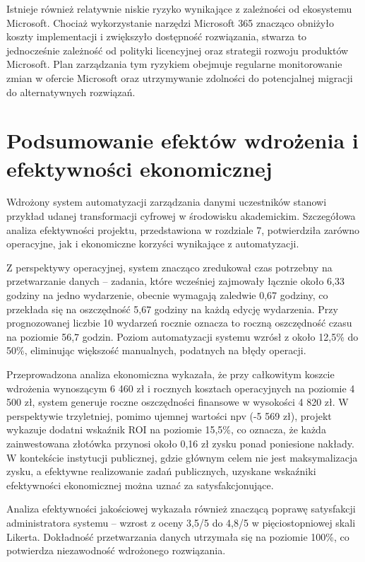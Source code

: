 Istnieje również relatywnie niskie ryzyko wynikające z zależności od ekosystemu Microsoft. Chociaż wykorzystanie narzędzi Microsoft 365 znacząco obniżyło koszty implementacji i zwiększyło dostępność rozwiązania, stwarza to jednocześnie zależność od polityki licencyjnej oraz strategii rozwoju produktów Microsoft. Plan zarządzania tym ryzykiem obejmuje regularne monitorowanie zmian w ofercie Microsoft oraz utrzymywanie zdolności do potencjalnej migracji do alternatywnych rozwiązań.

\section{Podsumowanie efektów wdrożenia i efektywności ekonomicznej}
Wdrożony system automatyzacji zarządzania danymi uczestników stanowi przykład udanej transformacji cyfrowej w środowisku akademickim. Szczegółowa analiza efektywności projektu, przedstawiona w rozdziale 7, potwierdziła zarówno operacyjne, jak i ekonomiczne korzyści wynikające z automatyzacji.

Z perspektywy operacyjnej, system znacząco zredukował czas potrzebny na przetwarzanie danych – zadania, które wcześniej zajmowały łącznie około 6,33 godziny na jedno wydarzenie, obecnie wymagają zaledwie 0,67 godziny, co przekłada się na oszczędność 5,67 godziny na każdą edycję wydarzenia. Przy prognozowanej liczbie 10 wydarzeń rocznie oznacza to roczną oszczędność czasu na poziomie 56,7 godzin. Poziom automatyzacji systemu wzrósł z około 12,5\% do 50\%, eliminując większość manualnych, podatnych na błędy operacji.

Przeprowadzona analiza ekonomiczna wykazała, że przy całkowitym koszcie wdrożenia wynoszącym 6 460 zł i rocznych kosztach operacyjnych na poziomie 4 500 zł, system generuje roczne oszczędności finansowe w wysokości 4 820 zł. W perspektywie trzyletniej, pomimo ujemnej wartości \gls{npv} (-5 569 zł), projekt wykazuje dodatni wskaźnik ROI na poziomie 15,5\%, co oznacza, że każda zainwestowana złotówka przynosi około 0,16 zł zysku ponad poniesione nakłady. W kontekście instytucji publicznej, gdzie głównym celem nie jest maksymalizacja zysku, a efektywne realizowanie zadań publicznych, uzyskane wskaźniki efektywności ekonomicznej można uznać za satysfakcjonujące.

Analiza efektywności jakościowej wykazała również znaczącą poprawę satysfakcji administratora systemu – wzrost z oceny 3,5/5 do 4,8/5 w pięciostopniowej skali Likerta. Dokładność przetwarzania danych utrzymała się na poziomie 100\%, co potwierdza niezawodność wdrożonego rozwiązania.

